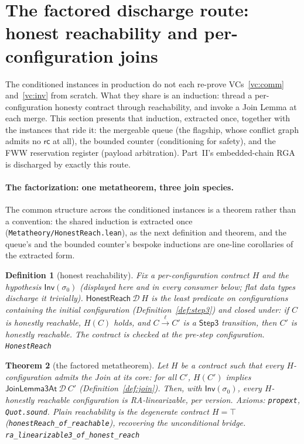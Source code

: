 \documentclass[11pt]{article}
\newtheorem{theorem}{Theorem}[section]
\newtheorem{definition}[theorem]{Definition}
\newcommand{\rcrel}{\mathsf{rc}}                 %
\newcommand{\Sinit}{\sigma_0}
\newcommand{\lean}[1]{\texttt{#1}}
\newcommand{\M}[1]{\mathcal{#1}}
\newcommand{\Inv}{\mathsf{Inv}}
\begin{document}
\section{The factored discharge route: honest reachability and
per-configuration joins}
\label{sec:route}

The conditioned instances in production do not each re-prove
VCs~\ref{vc:comm} and~\ref{vc:inv} from scratch. What they share is an
induction: thread a per-configuration honesty contract through
reachability, and invoke a Join Lemma at each merge. This section
presents that induction, extracted once, together with the instances
that ride it: the mergeable queue (the flagship, whose conflict graph
admits no $\rcrel$ at all), the bounded counter (conditioning for
safety), and the FWW reservation register (payload arbitration).
Part~II's embedded-chain RGA is discharged by exactly this route.

\paragraph{The factorization: one metatheorem, three join species.} The
common structure across the conditioned instances is a theorem rather
than a convention: the shared induction is extracted once
(\lean{Metatheory/HonestReach.lean}), as the next definition and
theorem, and the queue's and the bounded counter's bespoke inductions
are one-line corollaries of the extracted form.

\begin{definition}[honest reachability]
\label{def:honestreach}
Fix a per-configuration contract $H$ and the hypothesis $\Inv(\Sinit)$
(displayed here and in every consumer below; flat data types discharge
it trivially). $\mathsf{HonestReach}\ \M{D}\ H$ is the least predicate
on configurations containing the initial configuration
(Definition~\ref{def:step3}) and closed under: if $C$ is honestly
reachable, $H(C)$ holds, and $C \xrightarrow{\ell} C'$ is a
$\mathsf{Step3}$ transition, then $C'$ is honestly reachable. The
contract is checked at the \emph{pre-step} configuration.
\hfill\lean{HonestReach}
\end{definition}

\begin{theorem}[the factored metatheorem]
\label{thm:honestreach}
Let $H$ be a contract such that every $H$-configuration admits the Join
at its core: for all $C'$, $H(C')$ implies
$\mathsf{JoinLemma3At}\ \M{D}\ C'$ (Definition~\ref{def:join}). Then,
with $\Inv(\Sinit)$, every $H$-honestly reachable configuration is
RA-linearizable, per version. Axioms: \lean{propext}, \lean{Quot.sound}.
Plain reachability is the degenerate contract $H = \top$
(\lean{honestReach\_of\_reachable}), recovering the unconditional
bridge.
\hfill\lean{ra\_linearizable3\_of\_honest\_reach}
\end{theorem}
\end{document}
